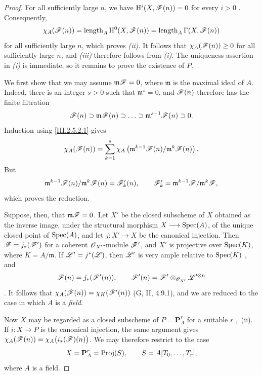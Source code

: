 \begin{proof}
For all sufficiently large $n$, we have $\mathrm{H}^i(X,\mathscr{F}(n))=0$
for every $i>0$ .
Consequently,
\[
  \chi_A(\mathscr{F}(n))
  =
  \operatorname{length}_A\mathrm{H}^0(X,\mathscr{F}(n))
  =
  \operatorname{length}_A\Gamma(X,\mathscr{F}(n))
\]
for all sufficiently large $n$, which proves \emph{(ii)}.
It follows that $\chi_A(\mathscr{F}(n))\geq0$ for all sufficiently large $n$, and \emph{(iii)} therefore follows from \emph{(i)}.
The uniqueness assertion in \emph{(i)} is immediate, so it remains to prove the existence of $P$.

We first show that we may assume $\mathfrak{m}\mathscr{F}=0$,
where $\mathfrak{m}$ is the maximal ideal of $A$.
Indeed, there is an integer $s>0$ such that $\mathfrak{m}^s=0$, and $\mathscr{F}(n)$ therefore has the finite filtration
\[
  \mathscr{F}(n)
  \supset\mathfrak{m}\mathscr{F}(n)
  \supset\ldots
  \supset\mathfrak{m}^{s-1}\mathscr{F}(n)
  \supset0.
\]
Induction using \eqref{III.2.5.2.1} gives
\[
  \chi_A(\mathscr{F}(n))
  =
  \sum_{k=1}^{s}
  \chi_A\left(
    \mathfrak{m}^{k-1}\mathscr{F}(n)/
    \mathfrak{m}^{k}\mathscr{F}(n)
  \right).
\]
But
\[
  \mathfrak{m}^{k-1}\mathscr{F}(n)/
  \mathfrak{m}^{k}\mathscr{F}(n)
  =
  \mathscr{F}'_k(n),
  \qquad
  \mathscr{F}'_k=
  \mathfrak{m}^{k-1}\mathscr{F}/\mathfrak{m}^{k}\mathscr{F},
\]
which proves the reduction.

Suppose, then, that $\mathfrak{m}\mathscr{F}=0$.
Let $X'$ be the closed subscheme of $X$ obtained as the inverse image, under the structural morphism $X\longrightarrow\operatorname{Spec}(A)$,
of the unique closed point of $\operatorname{Spec}(A)$, and let $j:X'\to X$ be the canonical injection.
Then $\mathscr{F}=j_*(\mathscr{F}')$
for a coherent $\mathscr{O}_{X'}$-module $\mathscr{F}'$, and $X'$ is projective over $\operatorname{Spec}(K)$, where $K=A/\mathfrak{m}$.
If $\mathscr{L}'=j^*(\mathscr{L})$, then $\mathscr{L}'$ is very ample relative to $\operatorname{Spec}(K)$ , and
\[
  \mathscr{F}(n)=j_*(\mathscr{F}'(n)),
  \qquad
  \mathscr{F}'(n)
  =
  \mathscr{F}'\otimes_{\mathscr{O}_{X'}}\mathscr{L}'^{\otimes n}
\]
.
It follows that $\chi_A(\mathscr{F}(n))
=
\chi_K(\mathscr{F}'(n))$
(G, II, 4.9.1), and we are reduced to the case in which $A$ is a \emph{field}.

Now $X$ may be regarded as a closed subscheme of $P=\mathbf{P}_A^r$
for a suitable $r$ ,~(ii).
If $i:X\to P$ is the canonical injection, the same argument gives $\chi_A(\mathscr{F}(n))
=
\chi_A\bigl(i_*(\mathscr{F})(n)\bigr)$.
We may therefore restrict to the case
\[
  X=\mathbf{P}_A^r=\operatorname{Proj}(S),
  \qquad
  S=A[T_0,\ldots,T_r],
\]
where $A$ is a field.


\end{proof}

